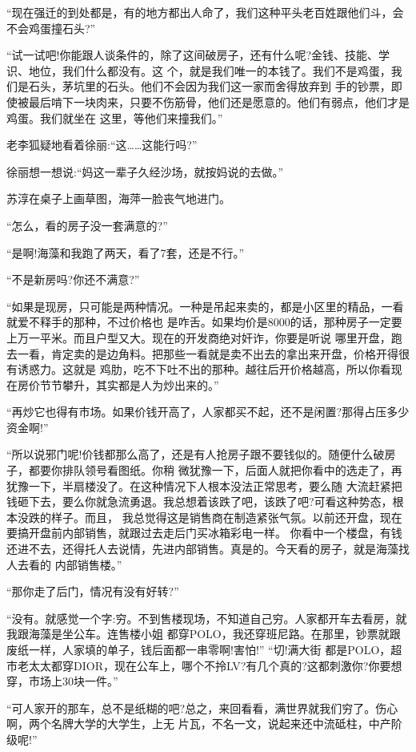 \documentclass[11pt,a4paper,onecolumn]{article}
\begin{document}
``现在强迁的到处都是，有的地方都出人命了，我们这种平头老百姓跟他们斗，会不会鸡蛋撞石头?''

``试一试吧!你能跟人谈条件的，除了这间破房子，还有什么呢?金钱、技能、学识、地位，我们什么都没有。这
个，就是我们唯一的本钱了。我们不是鸡蛋，我们是石头，茅坑里的石头。他们不会因为我们这一家而舍得放弃到
手的钞票，即使被最后啃下一块肉来，只要不伤筋骨，他们还是愿意的。他们有弱点，他们才是鸡蛋。我们就坐在
这里，等他们来撞我们。''

老李狐疑地看着徐丽:``这……这能行吗?''

徐丽想一想说:``妈这一辈子久经沙场，就按妈说的去做。''

苏淳在桌子上画草图，海萍一脸丧气地进门。

``怎么，看的房子没一套满意的?''

``是啊!海藻和我跑了两天，看了7套，还是不行。''

``不是新房吗?你还不满意?''

``如果是现房，只可能是两种情况。一种是吊起来卖的，都是小区里的精品，一看就爱不释手的那种，不过价格也
是咋舌。如果均价是8000的话，那种房子一定要上万一平米。而且户型又大。现在的开发商绝对奸诈，你要是听说
哪里开盘，跑去一看，肯定卖的是边角料。把那些一看就是卖不出去的拿出来开盘，价格开得很有诱惑力。这就是
鸡肋，吃不下吐不出的那种。越往后开价格越高，所以你看现在房价节节攀升，其实都是人为炒出来的。''

``再炒它也得有市场。如果价钱开高了，人家都买不起，还不是闲置?那得占压多少资金啊!''

``所以说邪门呢!价钱都那么高了，还是有人抢房子跟不要钱似的。随便什么破房子，都要你排队领号看图纸。你稍
微犹豫一下，后面人就把你看中的选走了，再犹豫一下，半扇楼没了。在这种情况下人根本没法正常思考，要么随
大流赶紧把钱砸下去，要么你就急流勇退。我总想着该跌了吧，该跌了吧?可看这种势态，根本没跌的样子。而且，
我总觉得这是销售商在制造紧张气氛。以前还开盘，现在要搞开盘前内部销售，就跟过去走后门买冰箱彩电一样。
你看中一个楼盘，有钱还进不去，还得托人去说情，先进内部销售。真是的。今天看的房子，就是海藻找人去看的
内部销售楼。''

``那你走了后门，情况有没有好转?''

``没有。就感觉一个字:穷。不到售楼现场，不知道自己穷。人家都开车去看房，就我跟海藻是坐公车。连售楼小姐
都穿POLO，我还穿班尼路。在那里，钞票就跟废纸一样，人家填的单子，钱后面都一串零啊!害怕!'' ``切!满大街
都是POLO，超市老太太都穿DIOR，现在公车上，哪个不拎LV?有几个真的?这都刺激你?你要想穿，市场上30块一件。''

``可人家开的那车，总不是纸糊的吧?总之，来回看看，满世界就我们穷了。伤心啊，两个名牌大学的大学生，上无
片瓦，不名一文，说起来还中流砥柱，中产阶级呢!''
\end{document}

